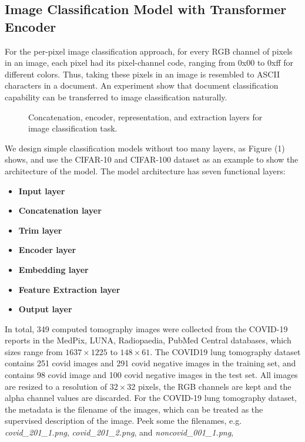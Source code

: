 \documentclass[runningheads]{llncs}
\begin{document}
\subsection{Image Classification Model with Transformer Encoder}


For the per-pixel image classification approach, for every RGB channel of pixels in an image,
each pixel had its pixel-channel code, ranging from 0x00 to 0xff for different colors.
Thus, taking these pixels in an image is resembled to ASCII characters in a document.
An experiment show that document classification capability can be transferred to image classification naturally.

\begin{figure*}
\begin{center}
\end{center}
   \caption{Concatenation, encoder, representation, and extraction layers for image classification task.}
\label{fig:short}
\end{figure*}

We design simple classification models without too many layers, as Figure (1) shows,
and use the CIFAR-10 and CIFAR-100 dataset as an example to show the architecture of the model.
The model architecture has seven functional layers:

\begin{itemize}
\item {\bf Input layer}
\item {\bf Concatenation layer}
\item {\bf Trim layer}
\item {\bf Encoder layer}
\item {\bf Embedding layer}
\item {\bf Feature Extraction layer}
\item {\bf Output layer}
\end{itemize}


\par In total, 349 computed tomography images were collected from the COVID-19 reports in the MedPix, LUNA, Radiopaedia,
PubMed Central databases, which sizes range from $1637\times1225$ to $148\times61$.
The COVID19 lung tomography dataset contains 251 covid images and 291 covid negative images in the training set,
and contains 98 covid image and 100 covid negative images in the test set.
All images are resized to a resolution of $32\times32$ pixels, the RGB channels are kept and the alpha channel values are discarded.
For the COVID-19 lung tomography dataset, the metadata is the filename of the images, which can be treated as the supervised description of the image.
Peek some the filenames, e.g. \textit{covid\_201\_1.png}, \textit{covid\_201\_2.png}, and \textit{noncovid\_001\_1.png},
\end{document}
